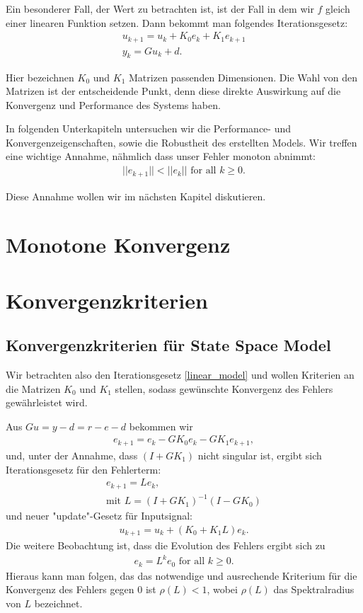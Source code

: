 Ein besonderer Fall, der Wert zu betrachten ist, ist der Fall in dem wir $f$ gleich einer linearen Funktion setzen. Dann bekommt man folgendes Iterationsgesetz: 
\begin{align}
u_{k+1} = u_k + K_0 e_k + K_1 e_{k+1} \label{linear_model} \\ 
y_k = G u_k + d. \nonumber
\end{align}

Hier bezeichnen $K_0$ und $K_1$ Matrizen passenden Dimensionen. Die Wahl von den Matrizen ist der entscheidende Punkt, denn diese direkte Auswirkung auf die Konvergenz und Performance des Systems haben. 

In folgenden Unterkapiteln untersuchen wir die Performance- und Konvergenzeigenschaften, sowie die Robustheit des erstellten Models. Wir treffen eine wichtige Annahme, nähmlich dass unser Fehler monoton abnimmt: 
\begin{align}
||e_{k+1} || < ||e_k|| \text{ for all } k\geq 0.
\end{align}

Diese Annahme wollen wir im nächsten Kapitel diskutieren. 

\section{Monotone Konvergenz}

\section{Konvergenzkriterien} \label{UNA_conv_prop}

\subsection{Konvergenzkriterien für State Space Model}

Wir betrachten also den Iterationsgesetz \ref{linear_model} und wollen Kriterien an die Matrizen $K_0$ und $K_1$ stellen, sodass gewünschte Konvergenz des Fehlers gewährleistet wird. 

Aus $Gu = y-d = r - e - d$ bekommen wir
\begin{align}
e_{k+1} = e_k - GK_0 e_k - GK_1 e_{k+1},
\end{align}
und, unter der Annahme, dass $(I + GK_1)$ nicht singular ist, ergibt sich Iterationsgesetz für den Fehlerterm:
\begin{align}
e_{k+1} = L e_k, \\
\text{mit } L = (I+GK_1)^{-1}(I-GK_0)  \nonumber
\end{align}
und neuer "update"-Gesetz für Inputsignal:
\begin{align}
u_{k+1} = u_k + (K_0 + K_1 L ) e_k.
\end{align}
Die weitere Beobachtung ist, dass die Evolution des Fehlers ergibt sich zu 
\begin{align}
e_k = L^k e_0 \text{ for all } k \geq 0.
\end{align}
Hieraus kann man folgen, das das notwendige und ausrechende Kriterium für die Konvergenz des Fehlers gegen $0$ ist $\rho (L) < 1$, wobei $\rho(L)$ das Spektralradius von $L$ bezeichnet. 

